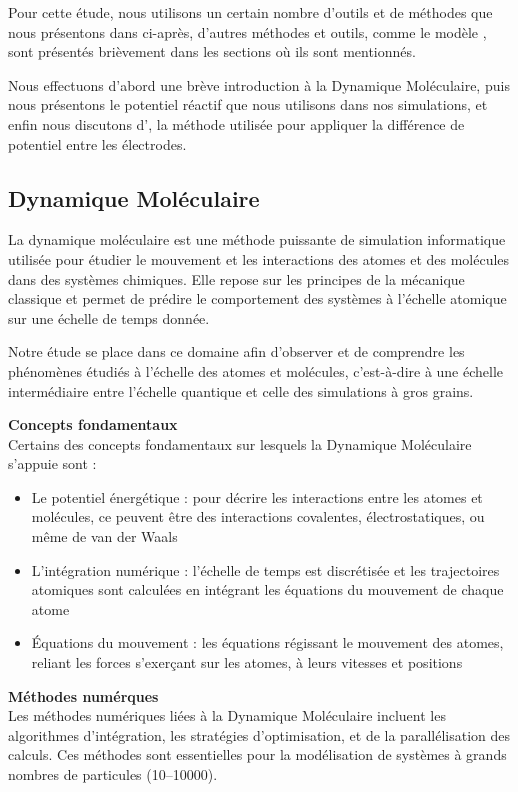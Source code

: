 Pour cette étude, nous utilisons un certain nombre d'outils et de méthodes que nous présentons dans ci-après, d'autres méthodes et outils, comme le modèle \spce{}, sont présentés brièvement dans les sections où ils sont mentionnés.

Nous effectuons d'abord une brève introduction à la Dynamique Moléculaire, puis nous présentons \reaxff{} le potentiel réactif que nous utilisons dans nos simulations, et enfin nous discutons d'\echemdid{}, la méthode utilisée pour appliquer la différence de potentiel entre les électrodes.

    \subsection{Dynamique Moléculaire}

La dynamique moléculaire est une méthode puissante de simulation informatique utilisée pour étudier le mouvement et les interactions des atomes et des molécules dans des systèmes chimiques. Elle repose sur les principes de la mécanique classique et permet de prédire le comportement des systèmes à l'échelle atomique sur une échelle de temps donnée.

Notre étude se place dans ce domaine afin d'observer et de comprendre les phénomènes étudiés à l'échelle des atomes et molécules, c'est-à-dire à une échelle intermédiaire entre l'échelle quantique et celle des simulations à gros grains.

\textbf{Concepts fondamentaux}\\
Certains des concepts fondamentaux sur lesquels la Dynamique Moléculaire s'appuie sont :
\begin{itemize}
    \item Le potentiel énergétique : pour décrire les interactions entre les atomes et molécules, ce peuvent être des interactions covalentes, électrostatiques, ou même de van der Waals
    \item L'intégration numérique : l'échelle de temps est discrétisée et les trajectoires atomiques sont calculées en intégrant les équations du mouvement de chaque atome
    \item Équations du mouvement : les équations régissant le mouvement des atomes, reliant les forces s'exerçant sur les atomes, à leurs vitesses et positions
\end{itemize}

\textbf{Méthodes numérques}\\
Les méthodes numériques liées à la Dynamique Moléculaire incluent les algorithmes d'intégration, les stratégies d'optimisation, et de la parallélisation des calculs. Ces méthodes sont essentielles pour la modélisation de systèmes à grands nombres de particules (\numrange{10}{10000}).

